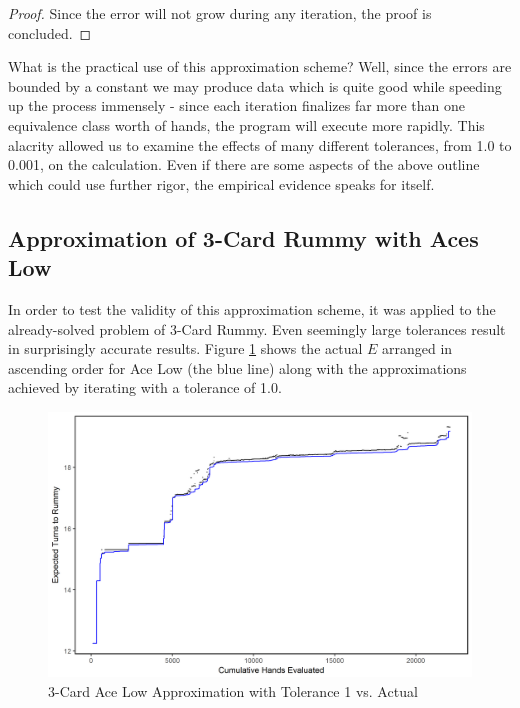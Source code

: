 \documentclass[letter,12pt]{article}
\begin{document}
\begin{proof}
Since the error will not grow during any iteration, the proof is concluded.
\end{proof}

What is the practical use of this approximation scheme? Well, since the errors are bounded by a constant we may produce data which is quite good while speeding up the process immensely - since each iteration finalizes far more than one equivalence class worth of hands, the program will execute more rapidly. This alacrity allowed us to examine the effects of many different tolerances, from 1.0 to 0.001, on the calculation. Even if there are some aspects of the above outline which could use further rigor, the empirical evidence speaks for itself.
 
\subsection{Approximation of 3-Card Rummy with Aces Low}

In order to test the validity of this approximation scheme, it was applied to the already-solved problem of 3-Card Rummy. Even seemingly large tolerances result in surprisingly accurate results. Figure \ref{fig:4} shows the actual $E$ arranged in ascending order for Ace Low (the blue line) along with the approximations achieved by iterating with a tolerance of 1.0.

\begin{figure}
\includegraphics[width=\textwidth]{fig4.png}
\caption{3-Card Ace Low Approximation with Tolerance 1 vs. Actual}\label{fig:4}
\end{figure}
\end{document}
